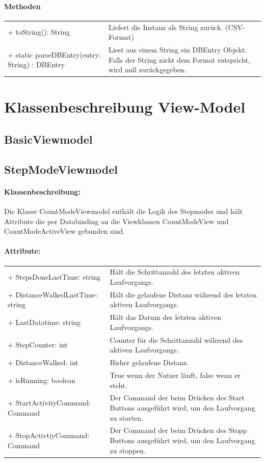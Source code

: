 \documentclass[a4paper,12pt]{article}
\begin{document}
	 \paragraph{Methoden}
	 \begin{tabular}{p{7cm}p{10cm}}
	 + toString(): String & Liefert die Instanz als String zurück. (\gls{CSV}-Format) \\
	 + static parseDBEntry(entry: String) : DBEntry & Liest aus einem String ein DBEntry Objekt. Falls der String nicht dem Format entspricht, wird null zurückgegeben. \\
	\end{tabular}
\section{Klassenbeschreibung View-Model}
\subsection{BasicViewmodel} %
\subsection{StepModeViewmodel}
\paragraph{Klassenbeschreibung:}
Die Klasse CountModeViewmodel enthält die Logik des Stepmodes  und hält Attribute die per Databinding an die Viewklassen CountModeView und CountModeActiveView gebunden sind. 
\paragraph{Attribute:}
\begin{tabular}{p{7cm}p{10cm}}
+ StepsDoneLastTime: string & Hält die Schrittanzahl des letzten aktiven Laufvorgangs. \\
+ DistanceWalkedLastTime: string & Hält die gelaufene Distanz während des letzten aktiven Laufvorgangs. \\
+ LastDatatime: string & Hält das Datum des letzten aktiven Laufvorgangs. \\
+ StepCounter: int & Counter für die Schrittanzahl während des aktiven Laufvorgangs. \\
+ DistanceWalked: int & Bisher gelaufene Distanz. \\
+ isRunning: boolean & True wenn der Nutzer läuft, false wenn er steht. \\
+ StartActivityCommand: Command & Der Command der beim Drücken des Start Buttons ausgeführt wird, um den Laufvorgang zu starten. \\
+ StopActivtiyCommand: Command & Der Command der beim Drücken des Stopp Buttons ausgeführt wird, um den Laufvorgang zu stoppen. \\
\end{tabular}
\end{document}

